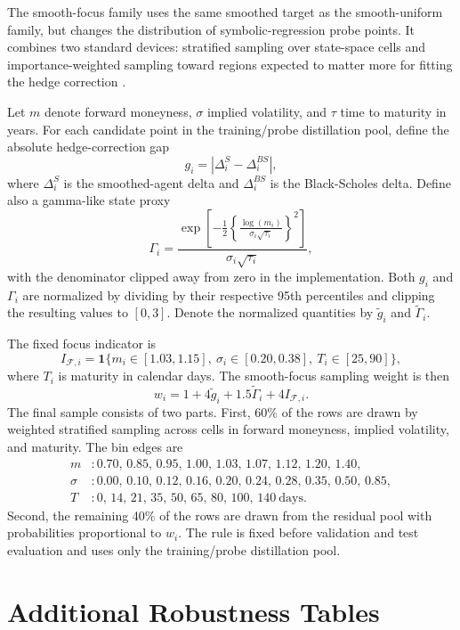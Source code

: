 \documentclass[a4paper,12pt]{article}
\numberwithin{equation}{section}
\begin{document}
The smooth-focus family uses the same smoothed target as the smooth-uniform family, but changes the distribution of symbolic-regression probe points. It combines two standard devices: stratified sampling over state-space cells and importance-weighted sampling toward regions expected to matter more for fitting the hedge correction \citep{cochran1977sampling,owen2013monte}.

Let $m$ denote forward moneyness, $\sigma$ implied volatility, and $\tau$ time to maturity in years. For each candidate point in the training/probe distillation pool, define the absolute hedge-correction gap
\[
    g_i = \left|\Delta_i^{S}-\Delta_i^{BS}\right|,
\]
where $\Delta_i^{S}$ is the smoothed-agent delta and $\Delta_i^{BS}$ is the Black-Scholes delta. Define also a gamma-like state proxy
\[
    \Gamma_i
    =
    \frac{
        \exp\left[-\frac{1}{2}\left\{\frac{\log(m_i)}{\sigma_i\sqrt{\tau_i}}\right\}^{2}\right]
    }{
        \sigma_i\sqrt{\tau_i}
    },
\]
with the denominator clipped away from zero in the implementation. Both $g_i$ and $\Gamma_i$ are normalized by dividing by their respective 95th percentiles and clipping the resulting values to $[0,3]$. Denote the normalized quantities by $\tilde g_i$ and $\tilde \Gamma_i$.

The fixed focus indicator is
\[
    I_{\mathcal F,i}
    =
    \mathbf{1}\{m_i\in[1.03,1.15],\ \sigma_i\in[0.20,0.38],\ T_i\in[25,90]\},
\]
where $T_i$ is maturity in calendar days. The smooth-focus sampling weight is then
\[
    w_i
    =
    1 + 4\tilde g_i + 1.5\tilde\Gamma_i + 4 I_{\mathcal F,i}.
\]
The final sample consists of two parts. First, 60\% of the rows are drawn by weighted stratified sampling across cells in forward moneyness, implied volatility, and maturity. The bin edges are
\[
\begin{aligned}
    m &: 0.70,\,0.85,\,0.95,\,1.00,\,1.03,\,1.07,\,1.12,\,1.20,\,1.40,\\
    \sigma &: 0.00,\,0.10,\,0.12,\,0.16,\,0.20,\,0.24,\,0.28,\,0.35,\,0.50,\,0.85,\\
    T &: 0,\,14,\,21,\,35,\,50,\,65,\,80,\,100,\,140\ \text{days}.
\end{aligned}
\]
Second, the remaining 40\% of the rows are drawn from the residual pool with probabilities proportional to $w_i$. The rule is fixed before validation and test evaluation and uses only the training/probe distillation pool.

\section{Additional Robustness Tables}
\captionsetup[table]{skip=2pt}
\end{document}
